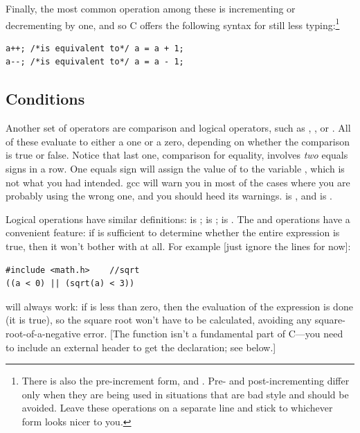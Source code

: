 \documentclass[12pt]{article}
\makeatletter
\def\cindex#1{\index{#1@\ci{#1}}}
\makeatother
\begin{document}
Finally, the most common operation among these is incrementing or decrementing by one, and so C offers the
following syntax for still less typing:\footnote{There is also the pre-increment form,  and
. Pre- and post-incrementing differ only when they are being used in situations that are bad style and should
be avoided. Leave these operations on a separate line and stick to whichever form looks nicer to you.} \\
\begin{lstlisting}
a++; /*is equivalent to*/ a = a + 1;
a--; /*is equivalent to*/ a = a - 1;
\end{lstlisting}



\subsection{Conditions} 	
\label{forloops}    
\cindex{<} \cindex{>} \cindex{==}
Another set of operators are comparison and logical operators, such as ,
, or . All of these evaluate to either a one or a zero, depending on whether the
comparison is true or false. Notice that last one, comparison for equality, involves {\sl two} equals
signs in a row. One equals sign  will assign the value of  to the variable , which is not what
you had intended. gcc will warn you in most of the cases where you are
probably using the wrong one, and you should heed its warnings.  is , and  is .

Logical operations have similar definitions: \cindex{\&\&} \cindex{"|"|} 
  
 is ;  is ;  is .
The \ci{\&\&} and \ci{||} operations have a convenient feature: if  is sufficient to determine whether
the entire expression is true, then it won't bother with  at all. For example [just ignore the  lines for now]:
\begin{lstlisting}
#include <math.h>    //sqrt
((a < 0) || (sqrt(a) < 3))
\end{lstlisting}
will always work: if  is less than zero, then the evaluation
of the expression is done (it is true), so the square root won't have
to be calculated, avoiding any square-root-of-a-negative error. 
[The  function isn't a fundamental part of C---you
need to include an external header to get the declaration; see below.]
\end{document}
